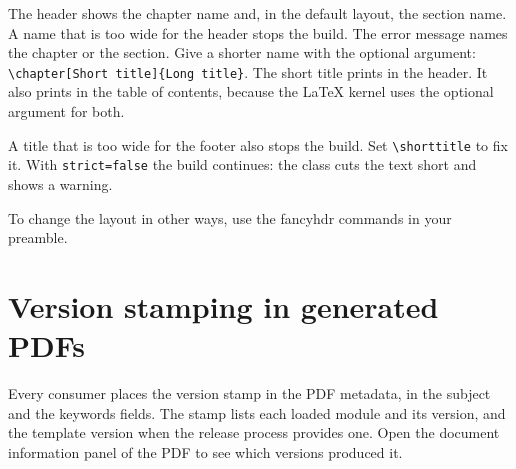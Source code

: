 \documentclass[a4paper,12pt]{article}
\begin{document}
The header shows the chapter name and, in the default layout, the section
name. A name that is too wide for the header stops the build. The error
message names the chapter or the section. Give a shorter name with the
optional argument: \verb|\chapter[Short title]{Long title}|. The short title
prints in the header. It also prints in the table of contents, because the
LaTeX kernel uses the optional argument for both.

A title that is too wide for the footer also stops the build. Set
\verb|\shorttitle| to fix it. With \verb|strict=false| the build continues:
the class cuts the text short and shows a warning.

To change the layout in other ways, use the \textsf{fancyhdr} commands in
your preamble.

\section{Version stamping in generated PDFs}
Every consumer places the version stamp in the PDF metadata, in the
subject and the keywords fields. The stamp lists each loaded module
and its version, and the template version when the release process
provides one. Open the document information panel of the PDF to see
which versions produced it.
\end{document}
